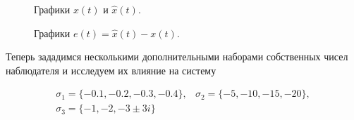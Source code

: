 \begin{figure}[!h]
\caption{Графики $x(t)$ и $\hat{x}(t)$.}
\label{3_xx_nlin_02_L1}
\end{figure}


\begin{figure}[!h]
\caption{Графики $e (t) =\hat{x}(t) - x(t)$.}
\label{3_e_nlin_02_L1}
\end{figure}

Теперь зададимся несколькими дополнительными наборами собственных чисел наблюдателя и исследуем их влияние на систему

\begin{equation*}
  \begin{matrix}
      \sigma_1 = \{ -0.1, -0.2, -0.3, -0.4 \}, & \sigma_2 = \{ -5, -10, -15, -20 \},\\
      \sigma_3 = \{ -1, -2, -3 \pm 3i \} & 
 \end{matrix}
\end{equation*}

